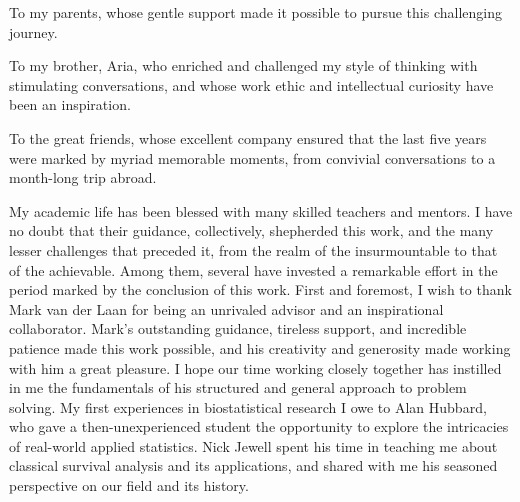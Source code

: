 \documentclass{ucbthesis}
\begin{document}


\maketitle
\copyrightpage



\begin{frontmatter}

\begin{dedication}
\null\vfil
\begin{center}
\vspace{12pt}

To my parents, whose gentle support made it possible to pursue this challenging
journey.

\vspace{22pt}

To my brother, Aria, who enriched and challenged my style of thinking with
stimulating conversations, and whose work ethic and intellectual curiosity have
been an inspiration.

\vspace{22pt}

To the great friends, whose excellent company ensured that the last five years
were marked by myriad memorable moments, from convivial conversations to
a month-long trip abroad.

\end{center}
\vfil\null
\end{dedication}


\tableofcontents
\clearpage
\listoffigures
\clearpage
\listoftables

\begin{acknowledgements}

My academic life has been blessed with many skilled teachers and mentors. I have
no doubt that their guidance, collectively, shepherded this work, and the many
lesser challenges that preceded it, from the realm of the insurmountable to that
of the achievable. Among them, several have invested a remarkable effort in the
period marked by the conclusion of this work. First and foremost, I wish to
thank Mark van der Laan for being an unrivaled advisor and an inspirational
collaborator. Mark's outstanding guidance, tireless support, and incredible
patience made this work possible, and his creativity and generosity made working
with him a great pleasure. I hope our time working closely together has
instilled in me the fundamentals of his structured and general approach to
problem solving. My first experiences in biostatistical research I owe to Alan
Hubbard, who gave a then-unexperienced student the opportunity to explore the
intricacies of real-world applied statistics. Nick Jewell spent his time in
teaching me about classical survival analysis and its applications, and shared
with me his seasoned perspective on our field and its history.


\end{acknowledgements}
\end{frontmatter}
\end{document}
